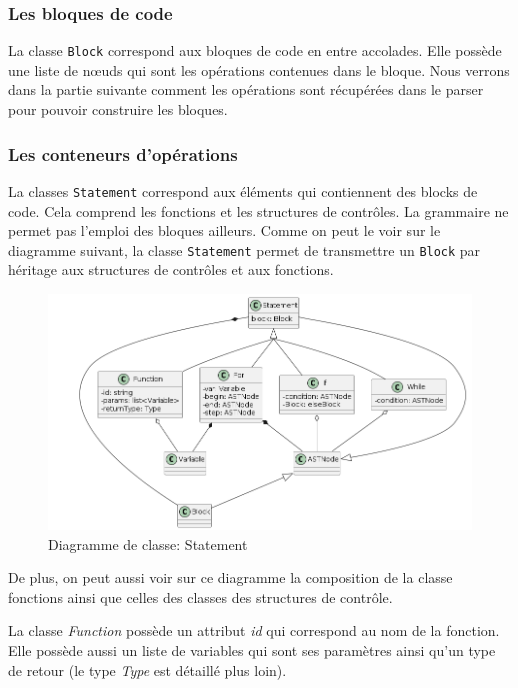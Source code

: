 \documentclass[a4paper]{article}%
\begin{document}
\subsubsection*{Les bloques de code}

La classe \lstinline{Block} correspond aux bloques de code en entre accolades.
Elle possède une liste de nœuds qui sont les opérations contenues dans le
bloque. Nous verrons dans la partie suivante comment les opérations sont
récupérées dans le \gls{parser} pour pouvoir construire les bloques.

\clearpage{}
\subsubsection*{Les conteneurs d'opérations}

La classes \lstinline{Statement} correspond aux éléments qui contiennent des
blocks de code. Cela comprend les fonctions et les structures de contrôles. La
grammaire ne permet pas l'emploi des bloques ailleurs. Comme on peut le voir sur
le diagramme suivant, la classe \lstinline{Statement} permet de transmettre un
\lstinline{Block} par héritage aux structures de contrôles et aux fonctions.

\begin{figure}[h!]
  \begin{center}
  \includegraphics[scale=0.5]{../ressources/diagrams/stmts.png}
  \caption{Diagramme de classe: Statement}
  \end{center}
\end{figure}

De plus, on peut aussi voir sur ce diagramme la composition de la classe
fonctions ainsi que celles des classes des structures de contrôle.

La classe \textit{Function} possède un attribut \textit{id} qui correspond au nom de la
fonction. Elle possède aussi un liste de variables qui sont ses paramètres ainsi
qu'un type de retour (le type \textit{Type} est détaillé plus loin).
\end{document}
